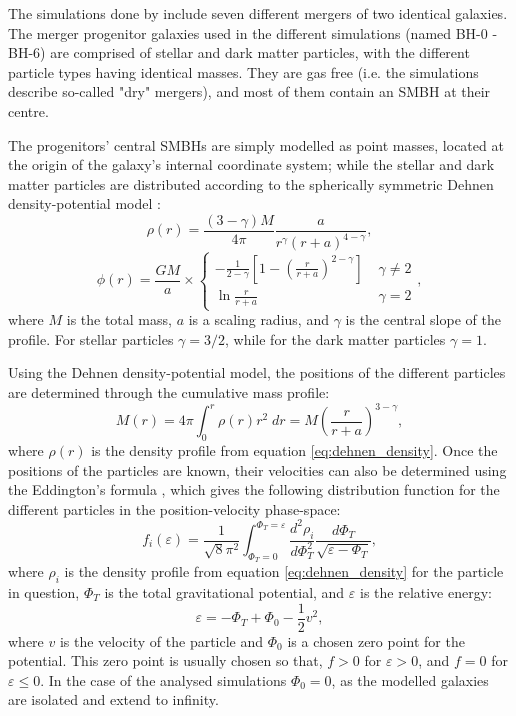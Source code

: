 \documentclass[english, oneside]{HYgradu}
\begin{document}
The simulations done by \cite{Rantala2018} include seven different mergers of two identical galaxies. The merger progenitor galaxies used in the different simulations (named BH-0 - BH-6) are comprised of stellar and dark matter particles, with the different particle types having identical masses. They are gas free (i.e. the simulations describe so-called "dry" mergers), and most of them contain an SMBH at their centre.

The progenitors' central SMBHs are simply modelled as point masses, located at the origin of the galaxy's internal coordinate system; while the stellar and dark matter particles are distributed according to the spherically symmetric Dehnen density-potential model \citep{Dehnen1993}:
\begin{equation}
\rho(r) = \frac{(3-\gamma)M}{4\pi} \frac{a}{r^\gamma (r+a)^{4-\gamma}}, \label{eq:dehnen_density}
\end{equation}
\begin{equation}
\phi(r) = \frac{GM}{a} \times 
\begin{cases}
	-\frac{1}{2-\gamma} \left[ 1 - \left( \frac{r}{r+a} \right)^{2-\gamma} \right] & \; \gamma \neq 2 \\
	\ln \frac{r}{r+a}	 & \; \gamma = 2
\end{cases},
\label{eq:dehnen_potential}
\end{equation}
where $M$ is the total mass, $a$ is a scaling radius, and $\gamma$ is the central slope of the profile. For stellar particles $\gamma = 3/2$, while for the dark matter particles $\gamma = 1$. 

Using the Dehnen density-potential model, the positions of the different particles are determined through the cumulative mass profile:
\begin{equation}
M(r) = 4\pi \int^r_0 \rho(r)r^2 \;dr = M \left( \frac{r}{r+a} \right)^{3-\gamma}, \label{eq:cumulative_mass}
\end{equation}
where $\rho(r)$ is the density profile from equation \ref{eq:dehnen_density}. Once the positions of the particles are known, their velocities can also be determined using the Eddington's formula \citep{BinneyTremaine}, which gives the following distribution function for the different particles in the position-velocity phase-space:
\begin{equation}
f_i(\varepsilon) = \frac{1}{\sqrt{8}\pi^2} \int^{\Phi_T = \varepsilon}_{\Phi_T = 0} \frac{d^2\rho_i}{d\Phi^2_T}
\frac{d\Phi_T}{\sqrt{\varepsilon - \Phi_T}}, \label{eq:eddington_form}
\end{equation}
where $\rho_i$ is the density profile from equation \ref{eq:dehnen_density} for the particle in question, $\Phi_T$ is the total gravitational potential, and $\varepsilon$ is the relative energy:
\begin{equation}
\varepsilon = -\Phi_T + \Phi_0 - \frac{1}{2} v^2,
\end{equation}
where $v$ is the velocity of the particle and $\Phi_0$ is a chosen zero point for the potential. This zero point is usually chosen so that, $f > 0$ for $\varepsilon > 0$, and $f = 0$ for $\varepsilon \leq 0$. In the case of the analysed simulations $\Phi_0 = 0$, as the modelled galaxies are isolated and extend to infinity.
\end{document}
